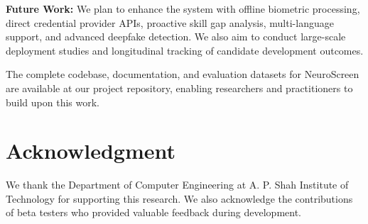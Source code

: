 \documentclass[conference]{IEEEtran}
\begin{document}
\textbf{Future Work:} We plan to enhance the system with offline biometric processing, direct credential provider APIs, proactive skill gap analysis, multi-language support, and advanced deepfake detection. We also aim to conduct large-scale deployment studies and longitudinal tracking of candidate development outcomes.

The complete codebase, documentation, and evaluation datasets for NeuroScreen are available at our project repository, enabling researchers and practitioners to build upon this work.

\section*{Acknowledgment}

We thank the Department of Computer Engineering at A. P. Shah Institute of Technology for supporting this research. We also acknowledge the contributions of beta testers who provided valuable feedback during development.
\end{document}
